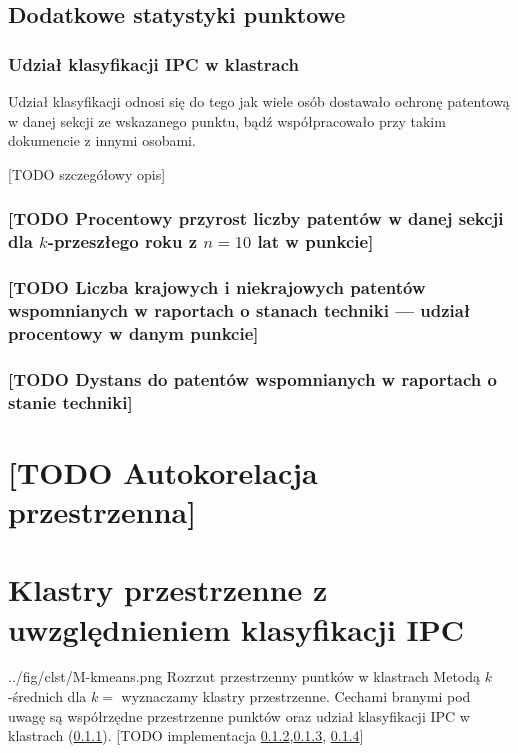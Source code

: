     \newpage\subsection
  {Dodatkowe statystyki punktowe}

  \subsubsection
{Udział klasyfikacji \ac{IPC} w klastrach}\label{udział-klasyfikacji}
Udział klasyfikacji odnosi się do tego jak wiele osób dostawało 
ochronę patentową w danej sekcji ze wskazanego punktu, 
bądź współpracowało przy takim dokumencie z innymi osobami.

[TODO szczegółowy opis]

  \subsubsection
{[TODO Procentowy przyrost liczby patentów w danej sekcji 
  dla $k$-przeszłego roku z $n=10$ lat w punkcie]}\label{przyrost-patentów}

  \subsubsection
{[TODO Liczba krajowych i niekrajowych patentów wspomnianych
  w raportach o stanach techniki --- udział procentowy w danym punkcie]}\label{rprt-krajowy}

  \subsubsection
{[TODO Dystans do patentów wspomnianych w raportach 
  o stanie techniki]}\label{rprt-krajowy-dystans}




    \newpage\section
  {[TODO Autokorelacja przestrzenna]}




    \newpage\section
  {Klastry przestrzenne z uwzględnieniem klasyfikacji \ac{IPC}}

  \figside
{../fig/clst/M-kmeans.png}
{Rozrzut przestrzenny puntków w klastrach}
{
Metodą $k$-średnich dla $k=$ wyznaczamy klastry przestrzenne. 
Cechami branymi pod uwagę są współrzędne przestrzenne punktów oraz
udział klasyfikacji \ac{IPC} w klastrach (\cref{udział-klasyfikacji}). 
[TODO implementacja \cref{przyrost-patentów},\cref{rprt-krajowy},
\cref{rprt-krajowy-dystans}]
}

